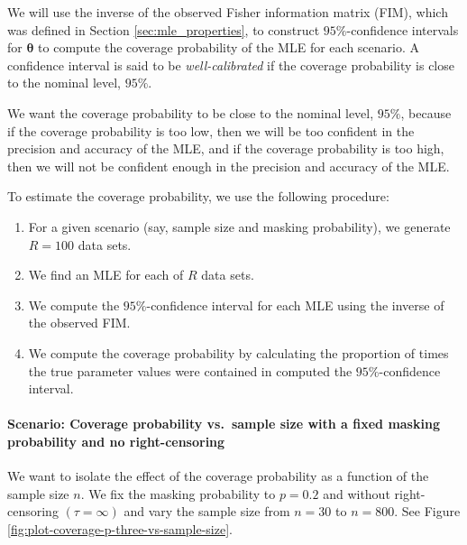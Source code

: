 \documentclass[
]{article}
\begin{document}
We will use the inverse of the observed Fisher information matrix (FIM),
which was defined in Section \ref{sec:mle_properties}, to construct
\(95\%\)-confidence intervals for \(\boldsymbol{\theta}\) to compute the
coverage probability of the MLE for each scenario. A confidence interval
is said to be \emph{well-calibrated} if the coverage probability is
close to the nominal level, \(95\%\).

We want the coverage probability to be close to the nominal level,
\(95\%\), because if the coverage probability is too low, then we will
be too confident in the precision and accuracy of the MLE, and if the
coverage probability is too high, then we will not be confident enough
in the precision and accuracy of the MLE.

To estimate the coverage probability, we use the following procedure:

\begin{enumerate}
\def\labelenumi{\arabic{enumi}.}
\item
  For a given scenario (say, sample size and masking probability), we
  generate \(R = 100\) data sets.
\item
  We find an MLE for each of \(R\) data sets.
\item
  We compute the \(95\%\)-confidence interval for each MLE using the
  inverse of the observed FIM.
\item
  We compute the coverage probability by calculating the proportion of
  times the true parameter values were contained in computed the
  \(95\%\)-confidence interval.
\end{enumerate}

\hypertarget{scenario-coverage-probability-vs.-sample-size-with-a-fixed-masking-probability-and-no-right-censoring}{%
\paragraph*{Scenario: Coverage probability vs.~sample size with a fixed
masking probability and no
right-censoring}\label{scenario-coverage-probability-vs.-sample-size-with-a-fixed-masking-probability-and-no-right-censoring}}

We want to isolate the effect of the coverage probability as a function
of the sample size \(n\). We fix the masking probability to \(p = 0.2\)
and without right-censoring \((\tau = \infty)\) and vary the sample size
from \(n = 30\) to \(n = 800\). See Figure
\ref{fig:plot-coverage-p-three-vs-sample-size}.
\end{document}
